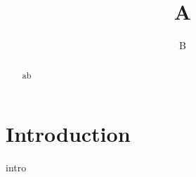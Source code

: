 \documentclass{article}
\title{A}
\author{B}
\begin{document}
\maketitle
\begin{abstract}ab\end{abstract}
\section{Introduction}
intro
\end{document}
